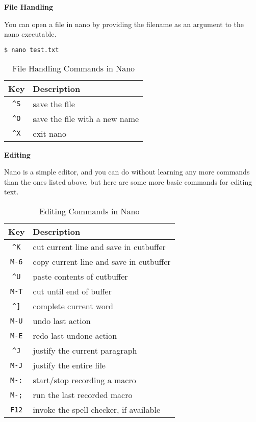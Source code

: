 \textbf{File Handling}

You can open a file in nano by providing the filename
as an argument to the nano executable.

\begin{lstlisting}[language=bash]
$ nano test.txt
\end{lstlisting}

\begin{table}[h!]
  \caption{File Handling Commands in Nano}
  \begin{tabular}{c l}
    \toprule
    Key & Description \\
    \midrule
    \texttt{\textasciicircum S} & save the file \\
    \texttt{\textasciicircum O} & save the file with a new name \\
    \texttt{\textasciicircum X} & exit nano \\
    \bottomrule
  \end{tabular}
\end{table}

\textbf{Editing}

Nano is a simple editor, and you can do without learning
any more commands than the ones listed above, but here
are some more basic commands for editing text.

\begin{table}[h!]
  \caption{Editing Commands in Nano}
  \begin{tabular}{c l}
    \toprule
    Key & Description \\
    \midrule
    \texttt{\textasciicircum K} & cut current line and save in cutbuffer \\
    \texttt{M-6} & copy current line and save in cutbuffer \\
    \texttt{\textasciicircum U} & paste contents of cutbuffer \\
    \texttt{M-T} & cut until end of buffer \\
    \texttt{\textasciicircum ]} & complete current word \\
    \texttt{M-U} & undo last action \\
    \texttt{M-E} & redo last undone action \\
    \texttt{\textasciicircum J} & justify the current paragraph \\
    \texttt{M-J} & justify the entire file \\
    \texttt{M-:} & start/stop recording a macro \\
    \texttt{M-;} & run the last recorded macro \\
    \texttt{F12} & invoke the spell checker, if available \\
    \bottomrule
  \end{tabular}
\end{table}

